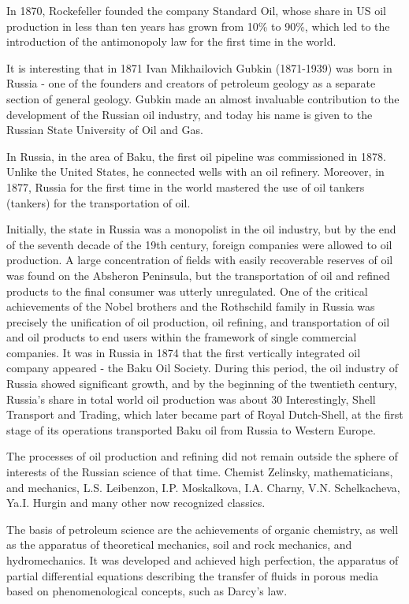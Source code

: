 \documentclass[12pt]{report}
\theoremstyle{definition}
\begin{document}
In 1870, Rockefeller founded the company Standard Oil, whose share in US oil production in less than ten years has grown from 10\% to 90\%, which led to the introduction of the antimonopoly law for the first time in the world.

It is interesting that in 1871 Ivan Mikhailovich Gubkin (1871-1939) was born in Russia - one of the founders and creators of petroleum geology as a separate section of general geology.
Gubkin made an almost invaluable contribution to the development of the Russian oil industry, and today his name is given to the Russian State University of Oil and Gas.

In Russia, in the area of Baku, the first oil pipeline was commissioned in 1878.
Unlike the United States, he connected wells with an oil refinery.
Moreover, in 1877, Russia for the first time in the world mastered the use of oil tankers (tankers) for the transportation of oil.

Initially, the state in Russia was a monopolist in the oil industry, but by the end of the seventh decade of the 19th century, foreign companies were allowed to oil production.
A large concentration of fields with easily recoverable reserves of oil was found on the Absheron Peninsula, but the transportation of oil and refined products to the final consumer was utterly unregulated.
One of the critical achievements of the Nobel brothers and the Rothschild family in Russia was precisely the unification of oil production, oil refining, and transportation of oil and oil products to end users within the framework of single commercial companies.
It was in Russia in 1874 that the first vertically integrated oil company appeared - the Baku Oil Society.
During this period, the oil industry of Russia showed significant growth, and by the beginning of the twentieth century, Russia's share in total world oil production was about 30%
Interestingly, Shell Transport and Trading, which later became part of Royal Dutch-Shell, at the first stage of its operations transported Baku oil from Russia to Western Europe.

The processes of oil production and refining did not remain outside the sphere of interests of the Russian science of that time.
Chemist Zelinsky, mathematicians, and mechanics, L.S. Leibenzon, I.P. Moskalkova, I.A. Charny, V.N. Schelkacheva, Ya.I. Hurgin and many other now recognized classics.

The basis of petroleum science are the achievements of organic chemistry, as well as the apparatus of theoretical mechanics, soil and rock mechanics, and hydromechanics.
It was developed and achieved high perfection, the apparatus of partial differential equations describing the transfer of fluids in porous media based on phenomenological concepts, such as Darcy's law.
\end{document}
